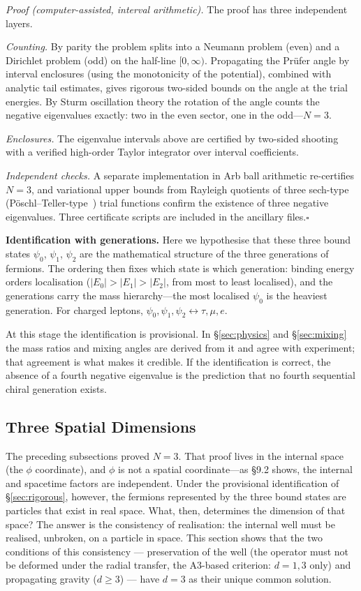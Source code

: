\documentclass[12pt,a4paper]{article}
\begin{document}
\noindent\textit{Proof (computer-assisted, interval arithmetic).}\;
The proof has three independent layers.

\emph{Counting.} By parity the problem splits into a Neumann problem (even) and a Dirichlet problem (odd) on the half-line $[0,\infty)$. Propagating the Pr\"ufer angle by interval enclosures (using the monotonicity of the potential), combined with analytic tail estimates, gives rigorous two-sided bounds on the angle at the trial energies. By Sturm oscillation theory the rotation of the angle counts the negative eigenvalues exactly: two in the even sector, one in the odd---$N = 3$.

\emph{Enclosures.} The eigenvalue intervals above are certified by two-sided shooting with a verified high-order Taylor integrator over interval coefficients.

\emph{Independent checks.} A separate implementation in Arb ball arithmetic re-certifies $N = 3$, and variational upper bounds from Rayleigh quotients of three sech-type (Pöschl--Teller-type~\cite{poschl}) trial functions confirm the existence of three negative eigenvalues. Three certificate scripts are included in the ancillary files.\hfill$\square$

\medskip\noindent
\textbf{Identification with generations.}
Here we hypothesise that these three bound states $\psi_0$, $\psi_1$, $\psi_2$ are the mathematical structure of the three generations of fermions. The ordering then fixes which state is which generation: binding energy orders localisation ($|E_0| > |E_1| > |E_2|$, from most to least localised), and the generations carry the mass hierarchy---the most localised $\psi_0$ is the heaviest generation. For charged leptons, $\psi_0, \psi_1, \psi_2 \leftrightarrow \tau, \mu, e$.

At this stage the identification is provisional. In \S\ref{sec:physics} and \S\ref{sec:mixing} the mass ratios and mixing angles are derived from it and agree with experiment; that agreement is what makes it credible. If the identification is correct, the absence of a fourth negative eigenvalue is the prediction that no fourth sequential chiral generation exists.


\subsection{Three Spatial Dimensions}\label{sec:dimension}
The preceding subsections proved $N = 3$. That proof lives in the
internal space (the $\phi$ coordinate), and $\phi$ is not a spatial
coordinate---as \S9.2 shows, the internal and spacetime factors are
independent. Under the provisional identification of \S\ref{sec:rigorous},
however, the fermions represented by the three bound states are
particles that exist in real space. What, then,
determines the dimension of that space? The answer is the consistency
of realisation: the internal well must be realised, unbroken, on a
particle in space. This section shows that the two conditions of
this consistency --- preservation of the well (the operator must not
be deformed under the radial transfer, the A3-based criterion:
$d = 1, 3$ only) and propagating
gravity ($d \ge 3$) --- have $d = 3$ as their unique common
solution.
\end{document}
